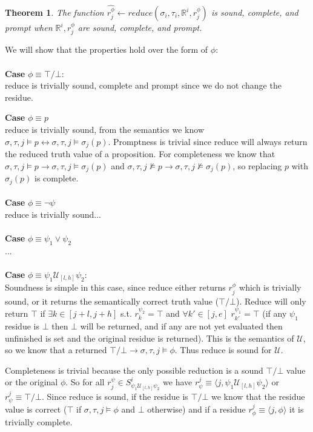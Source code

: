 \documentclass[10pt,a4paper]{article}
\newcommand{\rp}[2]{\ensuremath{\langle #1, #2 \rangle}}
\newcommand{\res}[2]{\ensuremath{r_{#1}^{#2}}}
\newtheorem{thm}{Theorem}
\begin{document}
\begin{thm}
The function $\hat{\res{j}{\phi}} \leftarrow reduce(\sigma_i, \tau_i, \mathbb{R}^i, \res{j}{\phi})$ is sound, complete, and prompt when $\mathbb{R}^i, \res{j}{\phi}$ are sound, complete, and prompt.
\end{thm}
\noindent We will show that the properties hold over the form of $\phi$: \\
\\ \noindent \textbf{Case} $\phi \equiv \top/\bot$: \\
reduce is trivially sound, complete and prompt since we do not change the residue.

\noindent \textbf{Case} $\phi \equiv p$ \\
reduce is trivially sound, from the semantics we know $\sigma, \tau, j \vDash p \leftrightarrow \sigma, \tau, j \vDash \sigma_j(p)$. Promptness is trivial since reduce will always return the reduced truth value of a proposition.  For completeness we know that $\sigma, \tau, j \vDash p \rightarrow \sigma, \tau, j \vDash \sigma_j(p)$ and $\sigma, \tau, j \nvDash p \rightarrow \sigma, \tau, j \nvDash \sigma_j (p)$, so replacing $p$ with $\sigma_j(p)$ is complete.
\\ \\ 
\noindent \textbf{Case} $\phi \equiv \neg \psi$ \\
reduce is trivially sound...
\\ \\
\noindent \textbf{Case} $\phi \equiv \psi_1 \vee \psi_2$ \\
...
\\ \\
\noindent \textbf{Case} $\phi \equiv \psi_1 \mathcal{U}_{[l,h]} \psi_2$: \\
Soundness is simple in this case, since reduce either returns $\res{j}{\phi}$ which is trivially sound, or it returns the semantically correct truth value ($\top/\bot$). Reduce will only return $\top$ if $\exists k \in [j+l,j+h]$ s.t. $\res{k}{\psi_2} = \top$ and $\forall k' \in [j,e]$ $\res{k'}{\psi_1} = \top$ (if any $\psi_1$ residue is $\bot$ then $\bot$ will be returned, and if any are not yet evaluated then unfinished is set and the original residue is returned). This is the semantics of $\mathcal{U}$, so we know that a returned $\top/\bot \rightarrow \sigma, \tau, j \vDash \phi$. Thus reduce is sound for $\mathcal{U}$.

Completeness is trivial because the only possible reduction is a sound $\top/\bot$ value or the original $\phi$. So for all $\res{j}{\psi} \in S^i_{\psi_1 \mathcal{U}_{[l,h]} \psi_2}$ we have $\res{\psi}{j} \equiv \rp{j}{\psi_1 \mathcal{U}_{[l,h]} \psi_2}$ or $\res{\psi}{j} \equiv \top/\bot$. Since reduce is sound, if the residue is $\top/\bot$ we know that the residue value is correct ($\top$ if $\sigma, \tau, j \vDash \phi$ and $\bot$ otherwise) and if a residue $\res{\phi}{j} \equiv \rp{j}{\phi}$ it is trivially complete.
\end{document}
